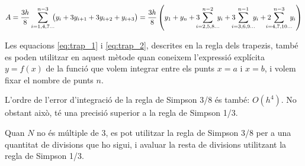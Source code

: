  \begin{equation}\label{eq:simp_3_8}
   A =  \frac{3h}{8} \sum_{i=1,4,7\dots}^{n-3} \hspace{-0.5em} \big( y_i + 3 y_{i+1} + 3 y_{i+2} + y_{i+3}\big) =
   \frac{3h}{8} \left( y_1 + y_n + 3 \hspace{-0.7em} \sum_{i=2,5,8\dots}^{n-2} \hspace{-0.5em} y_i +
   3 \hspace{-0.7em} \sum_{i=3,6,9\dots}^{n-1} \hspace{-0.5em} y_i
   + 2 \hspace{-0.9em} \sum_{i=4,7,10\dots}^{n-3} \hspace{-0.5em} y_i \right)
 \end{equation}

 Les equacions \eqref{eq:trap_1} i \eqref{eq:trap_2}, descrites en la regla dels trapezis, també es poden utilitzar en aquest mètode quan  coneixem l'expressió explícita $y=f(x)$ de la funció que volem integrar entre els punts $x=a$ i $x=b$, i volem fixar el nombre de punts $n$.

 L'ordre de l'error d'integració de la regla de Simpson 3/8 és també: $O(h^4)$. No obstant això, té una precisió superior a la regla de Simpson 1/3.
 
 Quan  $N$ no és múltiple de 3, es pot utilitzar la regla de Simpson 3/8 per a una quantitat de divisions que ho sigui, i avaluar la resta de divisions utilitzant la  regla de Simpson 1/3.



